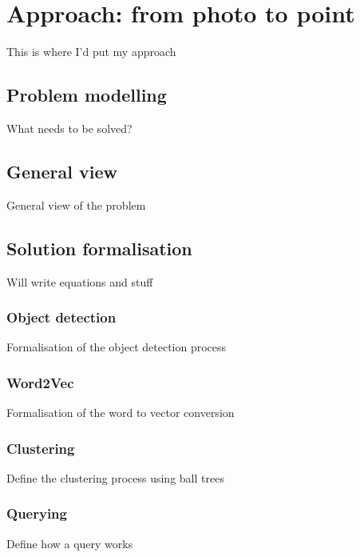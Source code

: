 \chapter{Approach: from photo to point}
\label {chap:approach}

This is where I'd put my approach

\section{Problem modelling}
\label{sec:approach_modelling}

What needs to be solved?

\section{General view}
\label{sec:approach_general}

General view of the problem

\section{Solution formalisation}
\label{sec:approach_formal}

Will write equations and stuff

\subsection{Object detection}
\label{subsec:approach_formal_obj}

Formalisation of the object detection process

\subsection{Word2Vec}
\label{subsec:approach_formal_word2vec}

Formalisation of the word to vector conversion

\subsection{Clustering}
\label{subsec:approach_formal_cluster}

Define the clustering process using ball trees

\subsection{Querying}
\label{subsec:approach_formal_query}

Define how a query works